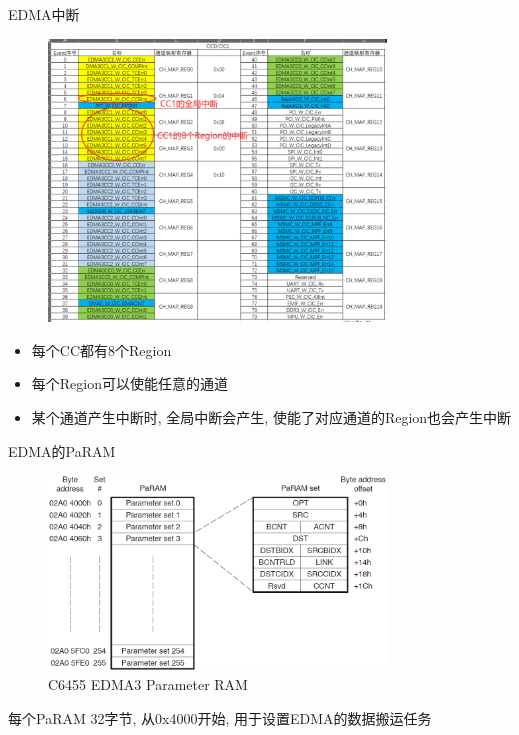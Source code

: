 \documentclass[10pt]{ctexbeamer}
\begin{document}
    \begin{frame}[allowframebreaks]{EDMA中断}
    \begin{figure}
        \centering
        \includegraphics[width=0.8\textwidth]{summary/10.eps}
    \end{figure}
    \begin{itemize}
        \setlength{\itemsep}{0.3cm}
        \item 每个CC都有8个Region
        \item 每个Region可以使能任意的通道
        \item 某个通道产生中断时, 全局中断会产生, 使能了对应通道的Region也会产生中断
    \end{itemize}
    \end{frame}

    \begin{frame}{EDMA的PaRAM}
        \begin{figure}
            \centering
            \includegraphics[width=0.8\textwidth]{summary/11.eps}
            \caption{C6455 EDMA3 Parameter RAM}
        \end{figure}
        \begin{center}
            每个PaRAM 32字节, 从0x4000开始, 用于设置EDMA的数据搬运任务
        \end{center}
    \end{frame}
\end{document}
